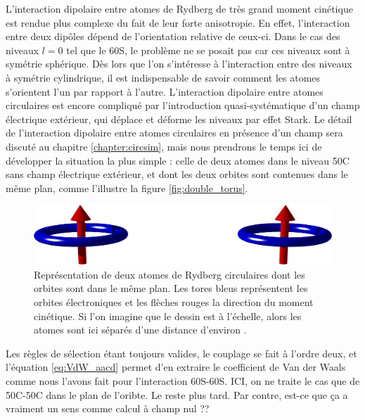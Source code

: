 \documentclass[11pt,a4paper,twoside]{book}
\begin{document}
\noindent L'interaction dipolaire entre atomes de Rydberg de très grand moment cinétique est rendue plus complexe du fait de leur forte anisotropie.
En effet, l'interaction entre deux dipôles dépend de l'orientation relative de ceux-ci.
Dans le cas des niveaux $l=0$ tel que le 60S, le problème ne se posait pas car ces niveaux sont à symétrie sphérique.
Dès lors que l'on s'intéresse à l'interaction entre des niveaux à symétrie cylindrique, il est indispensable de savoir comment les atomes s'orientent l'un par rapport à l'autre.
L'interaction dipolaire entre atomes circulaires est encore compliqué par l'introduction quasi-systématique d'un champ électrique extérieur, qui déplace et déforme les niveaux par effet Stark.
Le détail de l'interaction dipolaire entre atomes circulaires en présence d'un champ sera discuté au chapitre \ref{chapter:circsim}, mais nous prendrons le temps ici de développer la situation la plus simple :
celle de deux atomes dans le niveau 50C sans champ électrique extérieur, et dont les deux orbites sont contenues dans le même plan, comme l'illustre la figure \eqref{fig:double_torus}.

\begin{figure}[!h]
\centering
\includegraphics[width=.8\linewidth]{figures/double_torus.png}
\caption[Deux atomes circulaires côte à côte]{Représentation de deux atomes de Rydberg circulaires dont les orbites sont dans le même plan.
Les tores bleus représentent les orbites électroniques et les flèches rouges la direction du moment cinétique.
Si l'on imagine que le dessin est à l'échelle, alors les atomes sont ici séparés d'une distance d'environ .}
\label{fig:double_torus}
\end{figure}

Les règles de sélection étant toujours valides, le couplage se fait à l'ordre deux, et l'équation \eqref{eq:VdW_aacd} permet d'en extraire le coefficient de Van der Waals comme nous l'avons fait pour l'interaction 60S-60S.
		ICI, on ne traite le cas que de 50C-50C dans le plan de l'oribte. Le reste plus tard.
		Par contre, est-ce que ça a vraiment un sens comme calcul à champ nul ??
\end{document}
